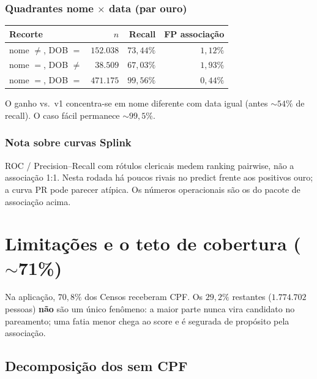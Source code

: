 \documentclass[11pt,a4paper]{article}
\begin{document}
\subsubsection{Quadrantes nome $\times$ data (par ouro)}

\begin{center}
\begin{tabular}{@{}lrrr@{}}
\toprule
Recorte & $n$ & Recall & FP associação \\
\midrule
nome $\neq$, DOB $=$ & $152{.}038$ & $73{,}44\%$ & $1{,}12\%$ \\
nome $=$, DOB $\neq$ & $38{.}509$ & $67{,}03\%$ & $1{,}93\%$ \\
nome $=$, DOB $=$ & $471{.}175$ & $99{,}56\%$ & $0{,}44\%$ \\
\bottomrule
\end{tabular}
\end{center}

O ganho vs.\ v1 concentra-se em nome diferente com data igual (antes
$\sim 54\%$ de recall). O caso fácil permanece $\sim 99{,}5\%$.

\subsubsection{Nota sobre curvas Splink}

ROC / Precision--Recall com rótulos clericais medem ranking pairwise, não a
associação 1:1. Nesta rodada há poucos rivais no predict frente aos positivos
ouro; a curva PR pode parecer atípica. Os números operacionais são os do
pacote de associação acima.

\section{Limitações e o teto de cobertura ($\sim$71\%)}

Na aplicação, $70{,}8\%$ dos Censos receberam CPF. Os $29{,}2\%$ restantes
($1{.}774{.}702$ pessoas) \textbf{não} são um único fenômeno: a maior parte
nunca vira candidato no pareamento; uma fatia menor chega ao score e é
segurada de propósito pela associação.

\subsection{Decomposição dos sem CPF}
\end{document}
